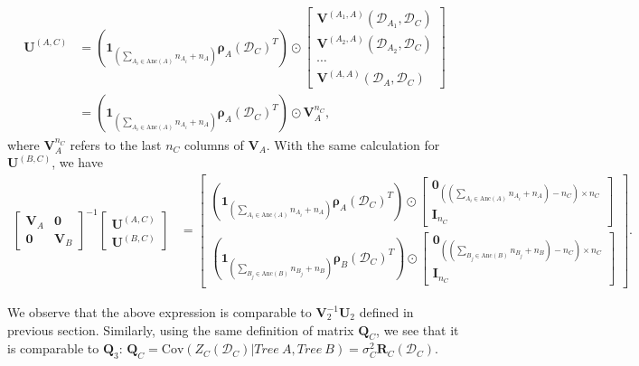 \documentclass[12pt]{article}
\newcommand{\bs}[1]{\boldsymbol{#1}}
\begin{document}
\begin{align*}
    \bs{U}^{(A,C)} &= (\bs{1}_{(\sum_{A_i\in \text{Anc}(A)}n_{A_i}+n_A)}\bs{\rho}_A(\mathcal{D}_C)^T)\odot
    \begin{bmatrix}
        \bs{V}^{(A_1,A)}(\mathcal{D}_{A_1},\mathcal{D}_C)\\
        \bs{V}^{(A_2,A)}(\mathcal{D}_{A_2},\mathcal{D}_C)\\
        \cdots\\
        \bs{V}^{(A,A)}(\mathcal{D}_{A},\mathcal{D}_C)
    \end{bmatrix}\\
    &= (\bs{1}_{(\sum_{A_i\in \text{Anc}(A)}n_{A_i}+n_A)}\bs{\rho}_A(\mathcal{D}_C)^T)\odot \bs{V}_A^{n_C},
\end{align*}
where $\bs{V}_A^{n_C}$ refers to the last $n_C$ columns of $\bs{V}_A$. With the same calculation for $\bs{U}^{(B,C)}$, we have
\begin{align*}
    \begin{bmatrix}
        \bs{V}_A & \bs{0}\\
        \bs{0} & \bs{V}_B
    \end{bmatrix}^{-1}
    \begin{bmatrix}
        \bs{U}^{(A,C)}\\
        \bs{U}^{(B,C)}
    \end{bmatrix}
    &=\begin{bmatrix}
        (\bs{1}_{(\sum_{A_i\in \text{Anc}(A)}n_{A_i}+n_A)}\bs{\rho}_A(\mathcal{D}_C)^T)\odot \begin{bmatrix}
            \bs{0}_{((\sum_{A_i\in \text{Anc}(A)}n_{A_i}+n_A)-n_C)\times n_C}\\
            \bs{I}_{n_C}
        \end{bmatrix}\\
        (\bs{1}_{(\sum_{B_j\in \text{Anc}(B)}n_{B_j}+n_B)}\bs{\rho}_B(\mathcal{D}_C)^T)\odot \begin{bmatrix}
            \bs{0}_{((\sum_{B_j\in \text{Anc}(B)}n_{B_j}+n_B)-n_C)\times n_C}\\
            \bs{I}_{n_C}
        \end{bmatrix}
        \end{bmatrix}.
\end{align*}

We observe that the above expression is comparable to $\bs{V}_2^{-1}\bs{U}_2$ defined in previous section. Similarly, using the same definition of matrix $\bs{Q}_C$, we see that it is comparable to $\bs{Q}_3$: $\bs{Q}_C = \text{Cov}(Z_C(\mathcal{D}_C)|Tree\ A, Tree\ B) = \sigma_C^2\bs{R}_C(\mathcal{D}_C)$.
\end{document}
